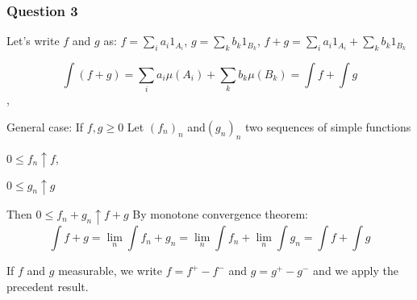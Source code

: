 \documentclass[12pt]{article}
\newcommand{\Q}[1]{\subsubsection*{Question #1}}
\begin{document}
\Q{3}
Let's write $f$ and $g$ as:
$f = \sum_i a_i 1_{A_i}$, $g = \sum_k b_k 1_{B_k}$,
$f+g = \sum_i a_i 1_{A_i} + \sum_k b_k 1_{B_k}$


$$\int (f+g) = \sum_i a_i \mu(A_i) + \sum_k b_k \mu(B_k) = \int f + \int g$$, 

General case:
If $f, g \geq 0$
Let $(f_n)_n$ and$ (g_n)_n$ two sequences of simple functions 

$0 \leq f_n \uparrow f$, 

$0 \leq g_n \uparrow g$

Then $0 \leq f_n + g_n \uparrow f+g$
By monotone convergence theorem:
$$\int f+g = \lim_n \int  f_n + g_n = \lim_n \int f_n + \lim_n \int g_n = \int f + \int g$$

If $f$ and $g$ measurable, we write $f = f^+ - f^-$ and $g = g^+ - g^-$ and we apply the precedent result.
\end{document}
